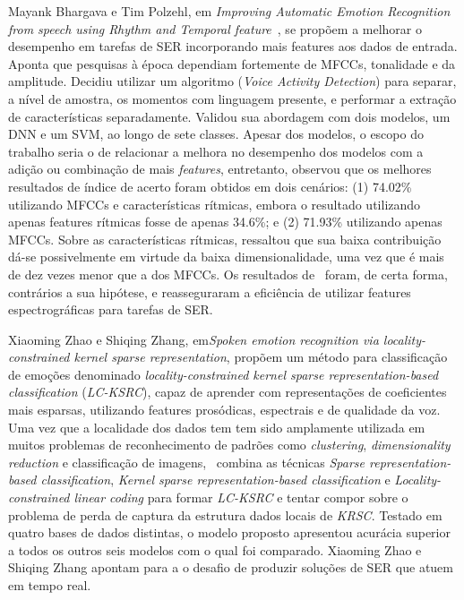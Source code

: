 Mayank Bhargava e Tim Polzehl, em \textit{Improving Automatic Emotion Recognition from speech using Rhythm and Temporal feature}~\cite{11}, se propõem a melhorar o desempenho em tarefas de \acrshort{SER} incorporando mais features aos dados de entrada. Aponta que pesquisas à época dependiam fortemente de \acrshort{MFCC}s, tonalidade e da amplitude. Decidiu utilizar um algoritmo (\textit{Voice Activity Detection}) para separar, a nível de amostra, os momentos com linguagem presente, e performar a extração de características separadamente. Validou sua abordagem com dois modelos, um \acrshort{DNN} e um \acrshort{SVM}, ao longo de sete classes. Apesar dos modelos, o escopo do trabalho seria o de relacionar a melhora no desempenho dos modelos com a adição ou combinação de mais \textit{features}, entretanto, observou que os melhores resultados de índice de acerto foram obtidos em dois cenários: (1) 74.02\% utilizando \acrshort{MFCC}s e características rítmicas, embora o resultado utilizando apenas features rítmicas fosse de apenas 34.6\%; e (2) 71.93\% utilizando apenas \acrshort{MFCC}s. Sobre as características rítmicas, ressaltou que sua baixa contribuição dá-se possivelmente em virtude da baixa dimensionalidade, uma vez que é mais de dez vezes menor que a dos \acrshort{MFCC}s. Os resultados de~\cite{11} foram, de certa forma, contrários a sua hipótese, e reasseguraram a eficiência de utilizar features espectrográficas para tarefas de \acrshort{SER}.

Xiaoming Zhao e Shiqing Zhang, em\textit{Spoken emotion recognition via locality-constrained kernel sparse representation}\cite{32.31}, propõem um método para classificação de emoções denominado \textit{locality-constrained kernel sparse representation-based classification} (\textit{LC-KSRC}), capaz de aprender com representações de coeficientes mais esparsas, utilizando features prosódicas, espectrais e de qualidade da voz. Uma vez que a localidade dos dados tem tem sido amplamente utilizada em muitos problemas de reconhecimento de padrões como \textit{clustering}, \textit{dimensionality reduction} e classificação de imagens,~\cite{32.31} combina as técnicas \textit{Sparse representation-based classification}, \textit{Kernel sparse representation-based classification} e \textit{Locality-constrained linear coding} para formar \textit{LC-KSRC} e tentar compor sobre o problema de perda de captura da estrutura dados locais de \textit{KRSC}. Testado em quatro bases de dados distintas, o modelo proposto apresentou acurácia superior a todos os outros seis modelos com o qual foi comparado. Xiaoming Zhao e Shiqing Zhang apontam para a o desafio de produzir soluções de SER que atuem em tempo real.

